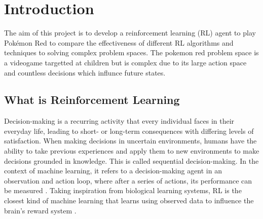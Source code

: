 \section{Introduction}
The aim of this project is to develop a reinforcement learning (RL) agent to play Pokémon Red to compare the effectiveness of different RL algorithms and techniques to solving complex problem spaces. The pokemon red problem space is a videogame targetted at children but is complex due to its large action space and countless decisions which influnce future states.


\subsection{What is Reinforcement Learning}

Decision-making is a recurring activity that every individual faces in their everyday life, leading to short- or long-term consequences with differing levels of satisfaction. When making decisions in uncertain environments, humans have the ability to take previous experiences and apply them to new environments to make decisions grounded in knowledge. This is called sequential decision-making. In the context of machine learning, it refers to a decision-making agent in an observation and action loop, where after a series of actions, its performance can be measured \cite{francon2020effective}. Taking inspiration from biological learning systems, RL is the closest kind of machine learning that learns using observed data to influence the brain's reward system \cite{Sutton1}. 

